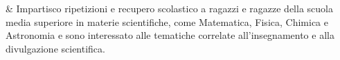 & Impartisco ripetizioni e recupero scolastico a ragazzi e ragazze della scuola media superiore in materie scientifiche, come Matematica, Fisica, Chimica e Astronomia e sono interessato alle tematiche correlate all'insegnamento e alla divulgazione scientifica.\\